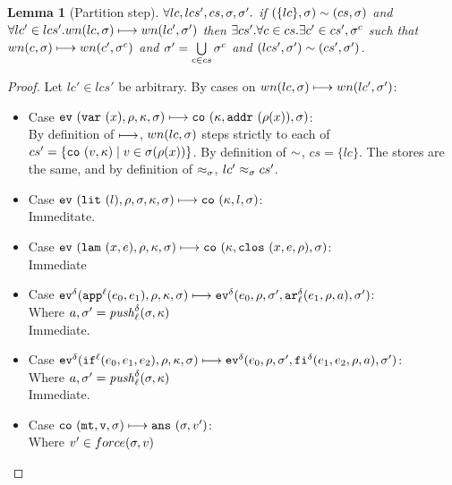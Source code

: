\documentclass[preprint,onecolumn,9pt]{sigplanconf} %
\newtheorem{lemma}{Lemma}
\begin{document}
\begin{lemma}[Partition step]
$\forall lc, lcs', cs, \msto, \msto'.$
 if  $\capprx{(\{lc\},\msto)}{(cs,\msto)}$
 and $\forall lc' \in lcs'. wn(lc,\msto) \machstep wn(lc', \msto')$ then
 $\exists cs'. \forall c \in cs. \exists c' \in cs', \msto^c$
 such that $wn(c,\msto) \machstep wn(c', \msto^c)$
 and       $\msto' = \bigcup\limits_{c \in cs}{\msto^c}$
 and       $\capprx{(lcs',\msto')}{(cs',\msto')}$.
\end{lemma}
\begin{proof}
Let $lc' \in lcs'$ be arbitrary.
By cases on $wn(lc,\msto) \machstep wn(lc', \msto')$:
\begin{itemize}
\item{Case $\ev{\svar{\mvar}, \menv, \mkont, \msto} \machstep \co{\mkont,
    \saddr{\menv(\mvar)}, \msto}$: \\ By definition of $\machstep$,
  $wn(lc,\msto)$ steps strictly to each of $cs' = \{\co{\mval, \mkont} \mid \mval \in \msto(\menv(\mvar))\}$.  By definition of
  $\capprx{}{}$, $cs = \{lc\}$. The stores are the same, and by
  definition of $\lapprx{}{\msto}{}$, $\lapprx{lc'}{\msto}{cs'}$.}
\item{Case $\ev{\slit{\mlit}, \menv, \msto, \mkont, \msto} \machstep
            \co{\mkont, \mlit, \msto}$: \\
      Immeditate.}
\item{Case $\ev{\slam{\mvar}{\mexp}, \menv, \mkont, \msto} \machstep
            \co{\mkont, \clos{\mvar, \mexp, \menv}, \msto}$: \\
      Immediate}
\item{Case $\ev[^\mcntr]{\sapp[^\mlab]{\mexp_0}{\mexp_1}, \menv, \mkont, \msto} \machstep
            \ev[^\mcntr]{\mexp_0, \menv, \msto', \kar[^\mcntr_\mlab]{\mexp_1, \menv, \maddr}, \msto'}$: \\
      Where $\maddr, \msto' = \mathit{push}_\mlab^\mcntr(\msto,\mkont)$ \\
      Immediate.}
\item{Case $\ev[^\mcntr]{\sif[^\mlab]{\mexp_0}{\mexp_1}{\mexp_2}, \menv, \mkont, \msto} \machstep
            \ev[^\mcntr]{\mexp_0, \menv, \msto', \kif[^\mcntr]{\mexp_1, \mexp_2, \menv, \maddr}, \msto'}$: \\
      Where $\maddr, \msto' = \mathit{push}_\mlab^\mcntr(\msto,\mkont)$ \\
      Immediate.}
\item{Case $\co{\kmt, \mval, \msto} \machstep \ans{\msto, \mval'}$: \\
      Where $\mval' \in force(\msto, \mval)$ \\
}
\end{itemize}
\end{proof}
\end{document}
